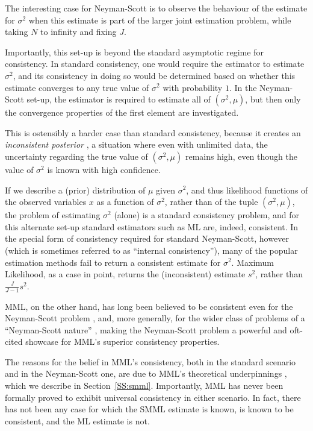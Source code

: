 \documentclass{IEEEtran}
\newcommand{\citep}[1]{\cite{#1}}
\begin{document}
The interesting
case for Neyman-Scott is to observe the behaviour of the estimate for
$\sigma^2$ when this estimate is part of the larger joint estimation problem,
while taking $N$ to infinity and fixing $J$.

Importantly, this set-up is beyond the standard asymptotic regime for
consistency. In standard consistency, one would require the estimator to
estimate $\sigma^2$, and its consistency in doing so would be determined
based on whether this estimate converges to any true value of $\sigma^2$ with
probability $1$. In the Neyman-Scott set-up, the estimator is required to
estimate all of $(\sigma^2,\mu)$, but then only the convergence properties
of the first element are investigated.

This is ostensibly a harder case than standard consistency, because it creates
an \emph{inconsistent posterior} \citep{ghosal1997review},
a situation where even with unlimited data, the uncertainty regarding the
true value of $(\sigma^2,\mu)$ remains high, even though the value of $\sigma^2$
is known with high confidence.

If we describe a (prior) distribution of $\mu$ given $\sigma^2$, and thus
likelihood functions of the observed variables $x$ as a function of $\sigma^2$,
rather than of the tuple $(\sigma^2,\mu)$, the problem of estimating
$\sigma^2$ (alone) is
a standard consistency problem, and for this alternate set-up standard
estimators such as ML are, indeed, consistent. In the special form of
consistency required for standard Neyman-Scott, however (which is sometimes
referred to as ``internal consistency''),
many of the popular estimation methods fail to return a consistent estimate
for $\sigma^2$. Maximum Likelihood, as a case in point, returns
the (inconsistent) estimate $s^2$, rather than $\frac{J}{J-1} s^2$.

MML, on the other hand, has long been believed to be consistent even for the
Neyman-Scott problem
\citep{makalic2012mml,makalic2009minimum,yatracos2015mle,laskar2001modified},
and, more generally, for the wider class of problems of a ``Neyman-Scott
nature'' \citep{dowe1997resolving}, making the Neyman-Scott problem a powerful
and oft-cited showcase for MML's superior consistency properties.

The reasons for the belief in MML's consistency, both in the standard
scenario and in the Neyman-Scott one, are due to MML's theoretical underpinnings
\citep{dowe1997resolving,DoweGardnerOppy2007}, which
we describe in Section~\ref{SS:smml}. Importantly, MML has never been formally
proved to exhibit universal consistency in either scenario.
In fact, there has not been any case for which the SMML estimate is
known, is known to be consistent, and the ML estimate is not.
\end{document}

